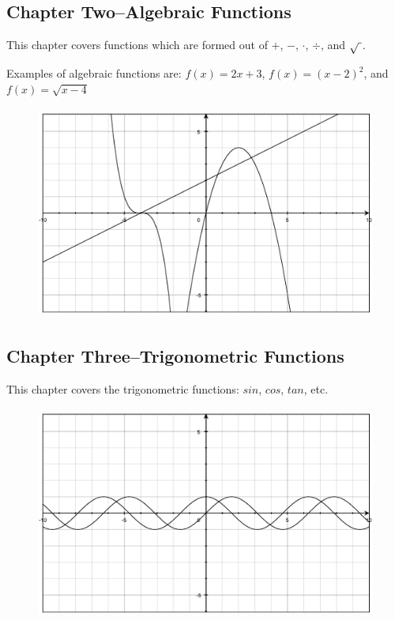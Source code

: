 \documentclass{article}
\begin{document}
\subsection{Chapter Two--Algebraic Functions}

This chapter covers functions which are formed out of $+$, $-$, $\cdot$, $\div$, and $\sqrt{\hspace{0.1cm}}$.  

Examples of algebraic functions are: $f(x) = 2x + 3$, $f(x) = (x-2)^2$, and $f(x) = \sqrt{x - 4}$


\begin{figure}[H]
  \includegraphics[width=12cm,height=7cm]{algebraic}
\end{figure}

\pagebreak

\subsection{Chapter Three--Trigonometric Functions}

This chapter covers the trigonometric functions: $sin$, $cos$, $tan$, etc.

\begin{figure}[H]
  \includegraphics[width=12cm,height=7cm]{trig}
\end{figure}
\end{document}
